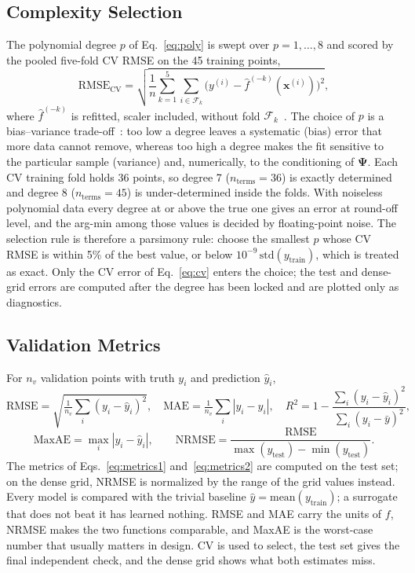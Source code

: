 \subsection{Complexity Selection}\label{sec:tuning_method}

The polynomial degree $p$ of Eq.~\eqref{eq:poly} is swept over $p=1,\dots,8$ and scored by the pooled five-fold CV RMSE on the 45 training points,
\begin{equation}
  \mathrm{RMSE}_{\mathrm{CV}}=\sqrt{\frac{1}{n}\sum_{k=1}^{5}\sum_{i\in\mathcal{F}_k}\big(y^{(i)}-\hat f^{(-k)}(\mathbf{x}^{(i)})\big)^2},
  \label{eq:cv}
\end{equation}
where $\hat f^{(-k)}$ is refitted, scaler included, without fold $\mathcal{F}_k$~\cite{hastie2009}. The choice of $p$ is a bias--variance trade-off~\cite{hastie2009}: too low a degree leaves a systematic (bias) error that more data cannot remove, whereas too high a degree makes the fit sensitive to the particular sample (variance) and, numerically, to the conditioning of $\boldsymbol{\Psi}$. Each CV training fold holds 36 points, so degree 7 ($n_{\mathrm{terms}}=36$) is exactly determined and degree 8 ($n_{\mathrm{terms}}=45$) is under-determined inside the folds. With noiseless polynomial data every degree at or above the true one gives an error at round-off level, and the arg-min among those values is decided by floating-point noise. The selection rule is therefore a parsimony rule: choose the smallest $p$ whose CV RMSE is within 5\% of the best value, or below $10^{-9}\,\mathrm{std}(y_{\mathrm{train}})$, which is treated as exact. Only the CV error of Eq.~\eqref{eq:cv} enters the choice; the test and dense-grid errors are computed after the degree has been locked and are plotted only as diagnostics.

\subsection{Validation Metrics}

For $n_v$ validation points with truth $y_i$ and prediction $\hat y_i$,
\begin{equation}
  \mathrm{RMSE}=\sqrt{\tfrac{1}{n_v}\textstyle\sum_i(y_i-\hat y_i)^2},\quad
  \mathrm{MAE}=\tfrac{1}{n_v}\textstyle\sum_i|y_i-\hat y_i|,\quad
  R^2=1-\dfrac{\sum_i(y_i-\hat y_i)^2}{\sum_i(y_i-\bar y)^2},
  \label{eq:metrics1}
\end{equation}
\begin{equation}
  \mathrm{MaxAE}=\max_i|y_i-\hat y_i|,\qquad
  \mathrm{NRMSE}=\frac{\mathrm{RMSE}}{\max(y_{\mathrm{test}})-\min(y_{\mathrm{test}})} .
  \label{eq:metrics2}
\end{equation}
The metrics of Eqs.~\eqref{eq:metrics1} and~\eqref{eq:metrics2} are computed on the test set; on the dense grid, NRMSE is normalized by the range of the grid values instead. Every model is compared with the trivial baseline $\hat y=\mathrm{mean}(y_{\mathrm{train}})$; a surrogate that does not beat it has learned nothing. RMSE and MAE carry the units of $f$, NRMSE makes the two functions comparable, and MaxAE is the worst-case number that usually matters in design. CV is used to select, the test set gives the final independent check, and the dense grid shows what both estimates miss.

